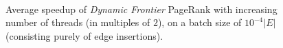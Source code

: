 \begin{figure}[!hbt]
  \centering
   \\[-2ex]
  \caption{Average speedup of \textit{Dynamic Frontier} PageRank with increasing number of threads (in multiples of $2$), on a batch size of $10^{-4}|E|$ (consisting purely of edge insertions).}
  \label{fig:strong-scaling}
\end{figure}
